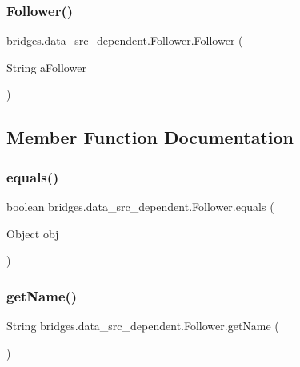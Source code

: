 \subsubsection{\texorpdfstring{Follower()}{Follower()}}
{\footnotesize\ttfamily bridges.\+data\+\_\+src\+\_\+dependent.\+Follower.\+Follower (\begin{DoxyParamCaption}\item[{String}]{a\+Follower }\end{DoxyParamCaption})}



\subsection{Member Function Documentation}
\hypertarget{classbridges_1_1data__src__dependent_1_1_follower_af98127e42a1adb6a64aae684544e571b}{}\label{classbridges_1_1data__src__dependent_1_1_follower_af98127e42a1adb6a64aae684544e571b} 
\subsubsection{\texorpdfstring{equals()}{equals()}}
{\footnotesize\ttfamily boolean bridges.\+data\+\_\+src\+\_\+dependent.\+Follower.\+equals (\begin{DoxyParamCaption}\item[{Object}]{obj }\end{DoxyParamCaption})}

\hypertarget{classbridges_1_1data__src__dependent_1_1_follower_a38620293ea907fbb2b2fca65a72f953f}{}\label{classbridges_1_1data__src__dependent_1_1_follower_a38620293ea907fbb2b2fca65a72f953f} 
\subsubsection{\texorpdfstring{get\+Name()}{getName()}}
{\footnotesize\ttfamily String bridges.\+data\+\_\+src\+\_\+dependent.\+Follower.\+get\+Name (\begin{DoxyParamCaption}{ }\end{DoxyParamCaption})}

